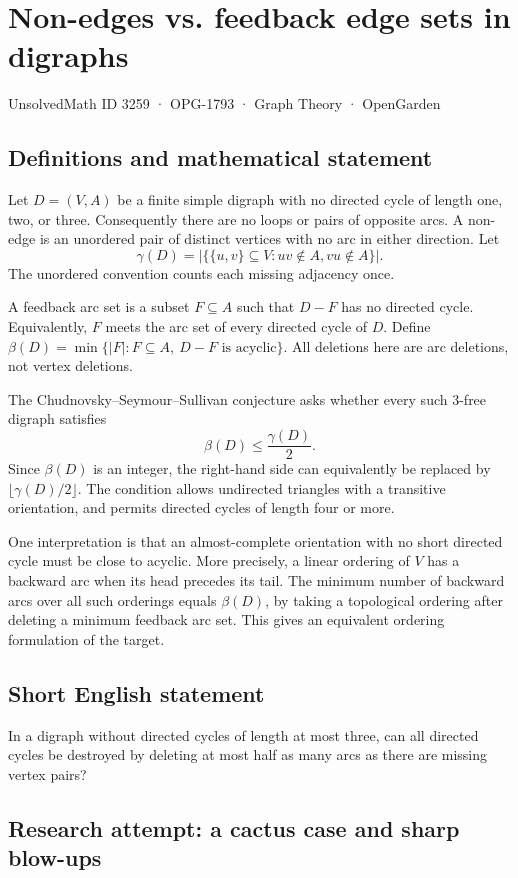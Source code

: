 \documentclass[11pt,a4paper]{article}
\begin{document}
\section*{Non-edges vs. feedback edge sets in digraphs}\label{3259}
{\small UnsolvedMath ID 3259 · OPG-1793 · Graph Theory · OpenGarden}
\subsection{Definitions and mathematical statement}
Let $D=(V,A)$ be a finite simple digraph with no directed cycle of length
one, two, or three. Consequently there are no loops or pairs of opposite
arcs. A non-edge is an unordered pair of distinct vertices with no arc
in either direction. Let
\[
 \gamma(D)=\bigl|\{\{u,v\}\subseteq V:uv\notin A, vu\notin A\}\bigr|.
\]
The unordered convention counts each missing adjacency once.

A feedback arc set is a subset $F\subseteq A$ such that $D-F$ has no
directed cycle. Equivalently, $F$ meets the arc set of every directed
cycle of $D$. Define
$\beta(D)=\min\{|F|:F\subseteq A,\ D-F\text{ is acyclic}\}$.
All deletions here are arc deletions, not vertex deletions.

The Chudnovsky--Seymour--Sullivan conjecture asks whether every such
3-free digraph satisfies
\[
                        \beta(D)\le\frac{\gamma(D)}2.
\]
Since $\beta(D)$ is an integer, the right-hand side can equivalently be
replaced by $\lfloor\gamma(D)/2\rfloor$. The condition allows undirected
triangles with a transitive orientation, and permits directed cycles
of length four or more.

One interpretation is that an almost-complete orientation with no short
directed cycle must be close to acyclic. More precisely, a linear ordering
of $V$ has a backward arc when its head precedes its tail. The minimum
number of backward arcs over all such orderings equals $\beta(D)$,
by taking a topological ordering after deleting a minimum feedback
arc set. This gives an equivalent ordering formulation of the target.
\subsection{Short English statement}
In a digraph without directed cycles of length at most three, can all directed cycles be destroyed by deleting at most half as many arcs as there are missing vertex pairs?
\subsection{Research attempt: a cactus case and sharp blow-ups}
\end{document}
